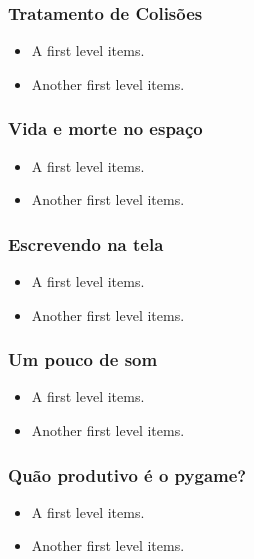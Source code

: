\begin{frame}
    \frametitle{Tratamento de Colisões}

    \begin{itemize}
        \item A first level items.
        \item Another first level items.
    \end{itemize}
\end{frame}

\begin{frame}
    \frametitle{Vida e morte no espaço}

    \begin{itemize}
        \item A first level items.
        \item Another first level items.
    \end{itemize}
\end{frame}

\begin{frame}
    \frametitle{Escrevendo na tela}

    \begin{itemize}
        \item A first level items.
        \item Another first level items.
    \end{itemize}
\end{frame}

\begin{frame}
    \frametitle{Um pouco de som}

    \begin{itemize}
        \item A first level items.
        \item Another first level items.
    \end{itemize}
\end{frame}

\begin{frame}
    \frametitle{Quão produtivo é o pygame?}

    \begin{itemize}
        \item A first level items.
        \item Another first level items.
    \end{itemize}
\end{frame}






